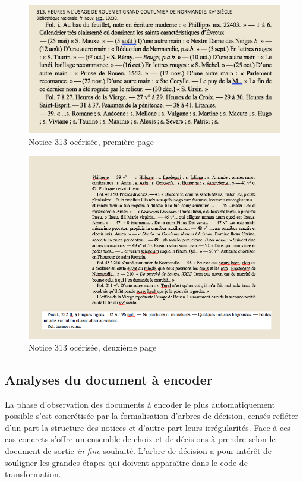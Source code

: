 \documentclass[a4paper,12pt,twoside]{book}
\begin{document}
	\begin{figure}[!h]
    \centering
    \includegraphics[width=15cm]{img/Notices_Leroquais/Notice313/OCR/noticeOCR_313_1.png}
    \caption{Notice 313 océrisée, première page}
    \end{figure}
    \clearpage
    
    \begin{figure}[!h]
    \centering
    \includegraphics[width=15cm]{img/Notices_Leroquais/Notice313/OCR/notice_OCR_313_2.png}
    \caption{Notice 313 océrisée, deuxième page}
    \end{figure}
    \clearpage
	
	\subsection{Analyses du document à encoder}
	
	La phase d'observation des documents à encoder le plus automatiquement possible s'est concrétisée par la formalisation d'arbres de décision, censés refléter d'un part la structure des notices et d'autre part leurs irrégularités. Face à ces cas concrets s'offre un ensemble de choix et de décisions à prendre selon le document de sortie \textit{in fine} souhaité. L'arbre de décision a pour intérêt de souligner les grandes étapes qui doivent apparaître dans le code de transformation. 
	
\end{document}
